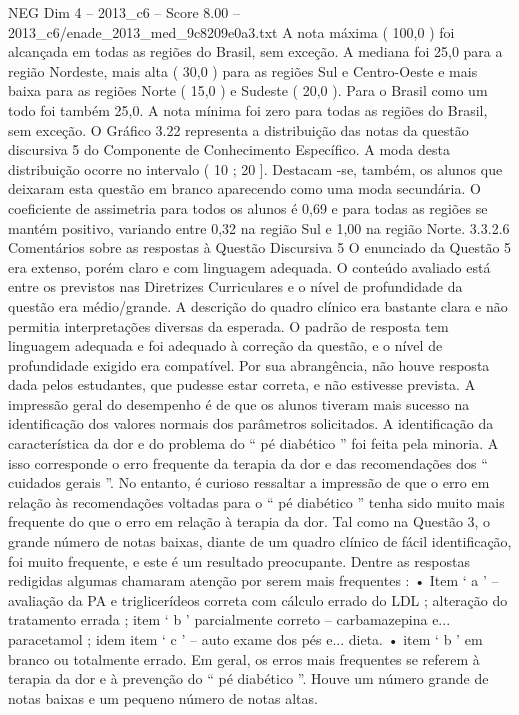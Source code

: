 \begin{textsample}{NEG Dim 4 – 2013\_c6 – Score 8.00 – 2013\_c6/enade\_2013\_med\_9c8209e0a3.txt}
A nota máxima ( 100,0 ) foi alcançada em todas as regiões do Brasil, sem exceção.
A mediana foi 25,0 para a região Nordeste, mais alta ( 30,0 ) para as regiões Sul e Centro-Oeste e mais baixa para as regiões Norte ( 15,0 ) e Sudeste ( 20,0 ).
Para o Brasil como um todo foi também 25,0.
A nota mínima foi zero para todas as regiões do Brasil, sem exceção.
O Gráfico 3.22 representa a distribuição das notas da questão discursiva 5 do Componente de Conhecimento Específico.
A moda desta distribuição ocorre no intervalo ( 10 ; 20 ].
Destacam -se, também, os alunos que deixaram esta questão em branco aparecendo como uma moda secundária.
O coeficiente de assimetria para todos os alunos é 0,69 e para todas as regiões se mantém positivo, variando entre 0,32 na região Sul e 1,00 na região Norte. 3.3.2.6 Comentários sobre as respostas à Questão Discursiva 5 O enunciado da Questão 5 era extenso, porém claro e com linguagem adequada.
O conteúdo avaliado está entre os previstos nas Diretrizes Curriculares e o nível de profundidade da questão era médio/grande.
A descrição do quadro clínico era bastante clara e não permitia interpretações diversas da esperada.
O padrão de resposta tem linguagem adequada e foi adequado à correção da questão, e o nível de profundidade exigido era compatível.
Por sua abrangência, não houve resposta dada pelos estudantes, que pudesse estar correta, e não estivesse prevista.
A impressão geral do desempenho é de que os alunos tiveram mais sucesso na identificação dos valores normais dos parâmetros solicitados.
A identificação da característica da dor e do problema do “ pé diabético ” foi feita pela minoria.
A isso corresponde o erro frequente da terapia da dor e das recomendações dos “ cuidados gerais ”.
No entanto, é curioso ressaltar a impressão de que o erro em relação às recomendações voltadas para o “ pé diabético ” tenha sido muito mais frequente do que o erro em relação à terapia da dor.
Tal como na Questão 3, o grande número de notas baixas, diante de um quadro clínico de fácil identificação, foi muito frequente, e este é um resultado preocupante.
Dentre as respostas redigidas algumas chamaram atenção por serem mais frequentes : • Item ‘ a ’ – avaliação da PA e triglicerídeos correta com cálculo errado do LDL ; alteração do tratamento errada ; item ‘ b ’ parcialmente correto – carbamazepina e... paracetamol ; idem item ‘ c ’ – auto exame dos pés e... dieta. • item ‘ b ’ em branco ou totalmente errado.
Em geral, os erros mais frequentes se referem à terapia da dor e à prevenção do “ pé diabético ”.
Houve um número grande de notas baixas e um pequeno número de notas altas.

\end{textsample}
